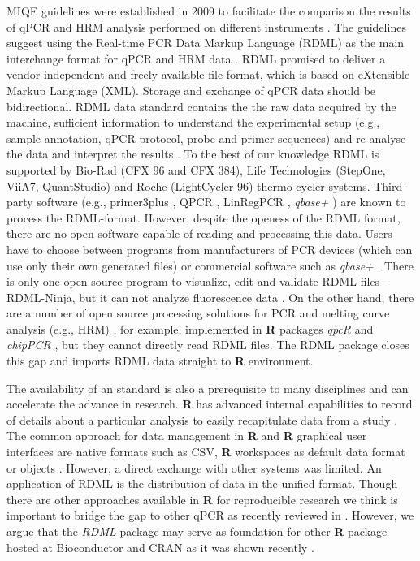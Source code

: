 \documentclass{bioinfo}
\begin{document}
	MIQE guidelines were established in 2009 to facilitate the comparison the
	results of qPCR and HRM analysis performed on different instruments
	\cite{bustin_miqe_2009, huggett_2013}. The guidelines suggest using the
	Real-time PCR Data Markup Language (RDML) as the main interchange format for
	qPCR and HRM data \cite{rdml-ninja_2015}. RDML promised to deliver a vendor
	independent and freely available file format, which is based on eXtensible
	Markup Language (XML). Storage and exchange of qPCR data should be
	bidirectional. RDML data standard contains the the raw data acquired by the
	machine, sufficient information to understand the experimental setup (e.g.,
	sample annotation, qPCR protocol, probe and primer sequences) and re-analyse the
	data and interpret the results \cite{lefever_rdml:_2009}. To the best of our
	knowledge RDML is supported by Bio-Rad (CFX 96 and CFX 384), Life Technologies
	(StepOne, ViiA7, QuantStudio) and Roche (LightCycler 96) thermo-cycler systems.
	Third-party software (e.g., primer3plus \cite{untergasser_2007}, QPCR
	\cite{pabinger_2009}, LinRegPCR \cite{ruijter_2014}, \textit{qbase+}
	\cite{hellemans_2007}) are known to process the RDML-format. However, despite
	the openess of the RDML format, there are no open software capable of reading
	and processing this data. Users have to choose between programs from
	manufacturers of PCR devices (which can use only their own generated files) or
	commercial software such as \textit{qbase+} \cite{rdml}. There is only one
	open-source program to visualize, edit and validate RDML files -- RDML-Ninja,
	but it can not analyze fluorescence data \cite{rdml-ninja_2015}. On the other
	hand, there are a number of open source processing solutions for PCR and melting
	curve analysis (e.g., HRM) \cite{roediger_RJ_2013,cousins_2012}, for example,
	implemented in \textbf{R} packages \textit{qpcR}\cite{ritz_qpcr:_2008} and
	\textit{chipPCR} \cite{rodiger2015chippcr}, but they cannot directly read RDML
	files. The RDML package closes this gap and imports RDML data straight to
	\textbf{R} environment.
	
	The availability of an standard is also a prerequisite to many disciplines and
	can accelerate the advance in research. \textbf{R} has advanced internal
	capabilities to record of details about a particular analysis to easily
	recapitulate data from a study \cite{liu_2014}. The common approach for data
	management in \textbf{R} and \textbf{R} graphical user interfaces are native
	formats such as CSV, \textbf{R} workspaces as default data format or objects
	\cite{rodiger_rkward_2012, pabinger_2014, RDCT2014c}. However, a direct exchange
	with other systems was limited. An application of RDML is the distribution of
	data in the unified format. Though there are other approaches available in
	\textbf{R} for reproducible research \cite{Leeper_2014} we think is important to
	bridge the gap to other qPCR as recently reviewed in \cite{pabinger_2014}. However, we 
	argue that the \textit{RDML} package may serve as foundation for other \textbf{R} package
	hosted at Bioconductor \cite{gentleman_2004} and CRAN \cite{RCT} as it was shown
	recently \cite{rodiger2015r}.
	
\end{document}
